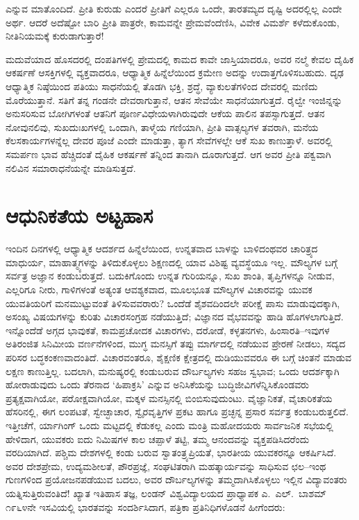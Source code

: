  ಎನ್ನುವ ಮಾತೊಂದಿದೆ. ಪ್ರೀತಿ ಕುರುಡು ಎಂದರೆ ಪ್ರೀತಿಗೆ ಎಲ್ಲರೂ ಒಂದೇ, ತಾರತಮ್ಯದ ದೃಷ್ಟಿ ಅದರಲ್ಲಿಲ್ಲ ಎಂದೇ ಅರ್ಥ. ಆದರೆ ಅದೆಷ್ಟೋ ಬಾರಿ ಪ್ರೀತಿ ಪಾತ್ರರೇ, ಕಾಮವನ್ನೇ ಪ್ರೇಮವೆಂದೆಣಿಸಿ, ವಿವೇಕ ವಿಮರ್ಶೆ ಕಳೆದುಕೊಂಡು, ನೀತಿನಿಯಮಕ್ಕೆ ಕುರುಡಾಗುತ್ತಾರೆ!

ಮದುವೆಯಾದ ಹೊಸದರಲ್ಲಿ ದಂಪತಿಗಳಲ್ಲಿ ಪ್ರೇಮದಲ್ಲಿ ಕಾಮದ ಕಾವೇ ಜಾಸ್ತಿಯಾದರೂ, ಅವರ ನಲ್ಮೆ ಕೇವಲ ದೈಹಿಕ ಆಕರ್ಷಣೆ ಆಸಕ್ತಿಗಳಲ್ಲಿ ವ್ಯಕ್ತವಾದರೂ, ಆಧ್ಯಾತ್ಮಿಕ ಹಿನ್ನೆಲೆಯಿಂದ ಕ್ರಮೇಣ ಅದನ್ನು ಉದಾತ್ತಗೊಳಿಸಬಹುದು. ದೃಢ ಆಧ್ಯಾತ್ಮಿಕ ನಿಷ್ಠೆಯಿಂದ ಪತಿಯು ಸಾಧನೆಯಲ್ಲಿ ತೊಡಗಿ ಭಕ್ತಿ, ಶ್ರದ್ಧೆ, ವ್ಯಾಕುಲತೆಗಳಿಂದ ದೇವರಲ್ಲಿ ಮಣಿದು ಮೊರೆಯುತ್ತಾನೆ. ಸತಿಗೆ ತನ್ನ ಗಂಡನೇ ದೇವರಾಗುತ್ತಾನೆ, ಆತನ ಸೇವೆಯೇ ಸಾಧನೆಯಾಗುತ್ತದೆ. ರೈಲ್ವೇ ಇಂಜಿನ್ನನ್ನು ಅನುಸರಿಸುವ ಬೋಗಿಗಳಂತೆ ಆತನಿಗೆ ಪೂರ್ಣವಿಧೇಯಳಾಗಿರುವುದೇ ಆಕೆಯ ಪಾಲಿನ ತಪಸ್ಸಾಗುತ್ತದೆ. ಆತನ ನೋವುನಲಿವು, ಸುಖದುಃಖಗಳಲ್ಲಿ ಒಂದಾಗಿ, ತಾಳ್ಮೆಯ ಗಣಿಯಾಗಿ, ಪ್ರೀತಿ ವಾತ್ಸಲ್ಯಗಳ ತವರಾಗಿ, ಮನೆಯ ಕೆಲಸಕಾರ್ಯಗಳನ್ನೆಲ್ಲ ದೇವರ ಪೂಜೆ ಎಂದೇ ಮಾಡುತ್ತಾ, ತ್ಯಾಗ ಸೇವೆಗಳಲ್ಲೇ ಆಕೆ ಸುಖ ಕಾಣುತ್ತಾಳೆ. ಅವರಲ್ಲಿ ಸಮರ್ಪಣ ಭಾವ ಹೆಚ್ಚಿದಂತೆ ದೈಹಿಕ ಆಕರ್ಷಣೆ ತನ್ನಿಂದ ತಾನಾಗಿ ದೂರಾಗುತ್ತದೆ. ಆಗ ಅವರ ಪ್ರೀತಿ ಪಕ್ವವಾಗಿ ನಲಿವಿನ ಸಮಾರಾಧನೆಯನ್ನೇ ಮಾಡಿಸುತ್ತದೆ.


\section*{ಆಧುನಿಕತೆಯ ಅಟ್ಟಹಾಸ}


ಇಂದಿನ ದಿನಗಳಲ್ಲಿ ಆಧ್ಯಾತ್ಮಿಕ ಆದರ್ಶದ ಹಿನ್ನೆಲೆಯಿಂದ, ಉನ್ನತವಾದ ಬಾಳನ್ನು ಬಾಳಿದಂಥವರ ಚಾರಿತ್ರ್ಯದ ಮಾಧುರ್ಯ, ಮಾಹಾತ್ಮ್ಯಗಳನ್ನು ತಿಳಿದುಕೊಳ್ಳಲು ಶಿಕ್ಷಣದಲ್ಲಿ ಯಾವ ವಿಶಿಷ್ಟ ವ್ಯವಸ್ಥೆಯೂ ಇಲ್ಲ. ಮೌಲ್ಯಗಳ ಬಗ್ಗೆ ಸರ್ವತ್ರ ಅಜ್ಞಾನ ಕಂಡುಬರುತ್ತದೆ. ಬದುಕಿಗೊಂದು ಉನ್ನತ ಗುರಿಯನ್ನೂ, ಸುಖ ಶಾಂತಿ, ತೃಪ್ತಿಗಳನ್ನೂ ನೀಡುವ, ಎಲ್ಲರಿಗೂ ನೀರು, ಗಾಳಿಗಳಂತೆ ಅತ್ಯಂತ ಆವಶ್ಯಕವಾದ, ಮೂಲಭೂತ ಮೌಲ್ಯಗಳ ವಿಚಾರವನ್ನು ಯುವಕ ಯುವತಿಯರಿಗೆ ಮನಮುಟ್ಟುವಂತೆ ತಿಳಿಸುವವರಾರು? ಒಂದೆಡೆ ಶೈಶವದಿಂದಲೇ ಪರೀಕ್ಷೆ ಪಾಸು ಮಾಡುವುದಕ್ಕಾಗಿ, ಅಸಂಖ್ಯ ವಿಷಯಗಳನ್ನು ಕುರಿತು ವಿಚಾರಸಂಗ್ರಹ ನಡೆಯುತ್ತಿದೆ; ವಿಜ್ಞಾನದ ವೈಭವವನ್ನು ಹಾಡಿ ಹೊಗಳಲಾಗುತ್ತಿದೆ. ಇನ್ನೊಂದೆಡೆ ಅಗ್ಗದ ಭಾವುಕತೆ, ಕಾಮಪ್ರಚೋದಕ ವಿಚಾರಗಳು, ದರೋಡೆ, ಕಳ್ಳತನಗಳು, ಹಿಂಸಾರತಿ–ಇವುಗಳ ಅತಿರಂಜಿತ ಸಿನಿಮೀಯ ವರ್ಣನೆಗಳಿಂದ, ಮುಗ್ಧ ಮನಸ್ಸಿಗೆ ತಪ್ಪು ಮಾರ್ಗದಲ್ಲಿ ನಡೆಯುವ ಪ್ರೇರಣೆ ನೀಡಲು, ಸದ್ಯದ ಪರಿಸರ ಬದ್ಧ\-ಕಂಕಣ\-ವಾದಂ\-ತಿದೆ. ವಿಚಾರವಂತರೂ, ಶೈಕ್ಷಣಿಕ ಕ್ಷೇತ್ರದಲ್ಲಿ ದುಡಿಯುವವರೂ ಈ ಬಗ್ಗೆ ಚಿಂತನೆ ಮಾಡುವ ಲಕ್ಷಣ ಕಾಣುತ್ತಿಲ್ಲ. ಬದಲಾಗಿ, ಮನುಷ್ಯರಲ್ಲಿ ಕಂಡುಬರುವ ದೌರ್ಬಲ್ಯಗಳು ಸಹಜ ಸ್ವಭಾವ; ಒಂದು ಆದರ್ಶಕ್ಕಾಗಿ ಹೋರಾಡುವುದು ಒಂದು ತೆರನಾದ ‘ಹಿಪಾಕ್ರಸಿ’ ಎನ್ನುವ ಅನಿಸಿಕೆಯನ್ನು ಬುದ್ಧಿಜೀವಿಗಳೆನ್ನಿಸಿಕೊಂಡವರು ಪ್ರತ್ಯಕ್ಷವಾಗಿಯೋ, ಪರೋಕ್ಷವಾಗಿಯೋ, ಮಕ್ಕಳ ಮನಸ್ಸಿನಲ್ಲಿ ಬಿಂಬಿಸುವುದುಂಟು. ವೈಜ್ಞಾನಿಕತೆ, ವೈಚಾರಿಕತೆಯ ಹೆಸರಿನಲ್ಲಿ, ಈಗ ಲಂಪಟತೆ, ಸ್ವೇಚ್ಛಾಚಾರ, ಸ್ವೈರವೃತ್ತಿಗಳ ಪ್ರಕಟ ಹಾಗೂ ಪ್ರಚ್ಛನ್ನ ಪ್ರಸಾರ ಸರ್ವತ್ರ ಕಂಡುಬರುತ್ತಲಿದೆ. ಇತ್ತೀಚೆಗೆ, ರ್ಯಾಗಿಂಗ್ ಒಂದು ಮಟ್ಟದಲ್ಲಿ ಕೆಡುಕಲ್ಲ ಎಂದು ಮಂತ್ರಿ ಮಹೋದಯರು ಸಾರ್ವಜನಿಕ ಸಭೆಯಲ್ಲಿ ಹೇಳಿದಾಗ, ಯುವಕರು ಐದು ನಿಮಿಷಗಳ ಕಾಲ ಚಪ್ಪಾಳೆ ತಟ್ಟಿ, ತಮ್ಮ ಆನಂದವನ್ನು ವ್ಯಕ್ತಪಡಿಸಿದರೆಂದು ವರದಿಯಾಗಿದೆ. ಪಶ್ಚಿಮ ದೇಶಗಳಲ್ಲಿ ಕಂಡು ಬರುವ ಸ್ವಾತಂತ್ರ್ಯಪ್ರಿಯತೆ, ಭಾರತೀಯ ಯುವಕರನ್ನೂ ಆಕರ್ಷಿಸಿದೆ. ಅವರ ದೇಶಪ್ರೇಮ, ಉದ್ಯಮಶೀಲತೆ, ಪೌರಪ್ರಜ್ಞೆ, ಸಂಘಟಿತರಾಗಿ ಮಹತ್ಕಾರ್ಯವನ್ನು ಸಾಧಿಸುವ ಛಲ–ಇಂಥ ಗುಣಗಳಿಂದ ಪ್ರಯೋಜನ\break ಪಡೆ\-ಯುವ ಬದಲು, ಅವರ ದೌರ್ಬಲ್ಯಗಳನ್ನು ತಮ್ಮದಾಗಿಸಿಕೊಳ್ಳಲು ಇಲ್ಲಿನ ವಿದ್ಯಾವಂತರು ಯತ್ನಿಸುತ್ತಿರುವಂತಿದೆ! ಖ್ಯಾತ ಇತಿಹಾಸ ತಜ್ಞ, ಲಂಡನ್ ವಿಶ್ವವಿದ್ಯಾಲಯದ ಪ್ರಾಧ್ಯಾಪಕ ಎ.\ ಎಲ್.\ ಬಾಶಮ್ ೧೯೬೪ನೇ ಇಸವಿಯಲ್ಲಿ ಭಾರತವನ್ನು ಸಂದರ್ಶಿಸಿದಾಗ, ಪತ್ರಿಕಾ ಪ್ರತಿನಿಧಿ\-ಗಳೊಡನೆ ಹೀಗೆಂದರು:

